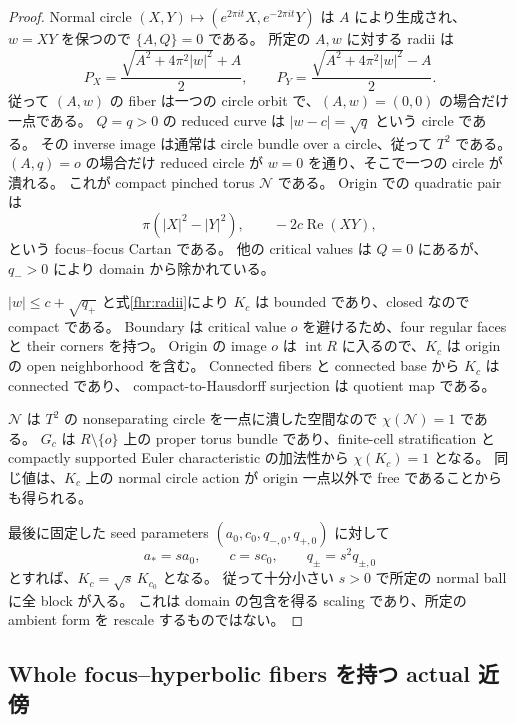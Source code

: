 \begin{proof}
Normal circle $(X,Y)\mapsto(e^{2\pi it}X,e^{-2\pi it}Y)$ は $A$ により生成され、
$w=XY$ を保つので $\{A,Q\}=0$ である。
所定の $A,w$ に対する radii は
\begin{equation}\label{fhr:radii}
 P_X=\frac{\sqrt{A^2+4\pi^2|w|^2}+A}{2},\qquad
 P_Y=\frac{\sqrt{A^2+4\pi^2|w|^2}-A}{2}.
\end{equation}
従って $(A,w)$ の fiber は一つの circle orbit で、$(A,w)=(0,0)$ の場合だけ一点である。
$Q=q>0$ の reduced curve は $|w-c|=\sqrt q$ という circle である。
その inverse image は通常は circle bundle over a circle、従って $T^2$ である。
$(A,q)=o$ の場合だけ reduced circle が $w=0$ を通り、そこで一つの circle が潰れる。
これが compact pinched torus $\mathcal N$ である。
Origin での quadratic pair は
\[
 \pi(|X|^2-|Y|^2),\qquad -2c\operatorname{Re}(XY),
\]
という focus--focus Cartan である。
他の critical values は $Q=0$ にあるが、$q_->0$ により domain から除かれている。

$|w|\le c+\sqrt{q_+}$ と式\eqref{fhr:radii}により $K_c$ は bounded であり、closed なので compact である。
Boundary は critical value $o$ を避けるため、four regular faces と their corners を持つ。
Origin の image $o$ は $\operatorname{int}R$ に入るので、$K_c$ は origin の open neighborhood を含む。
Connected fibers と connected base から $K_c$ は connected であり、
compact-to-Hausdorff surjection は quotient map である。

$\mathcal N$ は $T^2$ の nonseparating circle を一点に潰した空間なので $\chi(\mathcal N)=1$ である。
$G_c$ は $R\setminus\{o\}$ 上の proper torus bundle であり、finite-cell stratification と
compactly supported Euler characteristic の加法性から $\chi(K_c)=1$ となる。
同じ値は、$K_c$ 上の normal circle action が origin 一点以外で free であることからも得られる。

最後に固定した seed parameters $(a_0,c_0,q_{-,0},q_{+,0})$ に対して
\begin{equation}\label{fhr:scaling}
 a_*=s a_0,\qquad c=s c_0,\qquad q_\pm=s^2q_{\pm,0}
\end{equation}
とすれば、$K_c=\sqrt{s}\,K_{c_0}$ となる。
従って十分小さい $s>0$ で所定の normal ball に全 block が入る。
これは domain の包含を得る scaling であり、所定の ambient form を rescale するものではない。
\end{proof}

\subsection{Whole focus--hyperbolic fibers を持つ actual 近傍}

